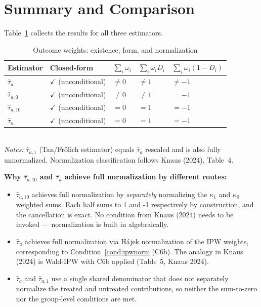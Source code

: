 \documentclass[12pt, a4paper]{article}
\theoremstyle{condstyle}
\theoremstyle{plain}
\newcommand{\that}[1]{\hat{\tau}_{#1}}
\begin{document}
\section{Summary and Comparison}
\label{sec:summary}

Table~\ref{tab:summary} collects the results for all three estimators.

\begin{table}[h!]
\centering
\caption{Outcome weights: existence, form, and normalization}
\label{tab:summary}
\renewcommand{\arraystretch}{1.4}
\begin{tabular}{@{}lllll@{}}
\toprule
Estimator & Closed-form & $\sum_i\omega_i$ & $\sum_i\omega_iD_i$ & $\sum_i\omega_i(1-D_i)$ \\
\midrule
$\that{a}$    & $\checkmark$ (unconditional) & $\neq 0$ & $\neq 1$ & $\neq -1$ \\
$\that{a,0}$  & $\checkmark$ (unconditional) & $\neq 0$ & $\neq 1$ & $= -1$    \\
$\that{a,10}$ & $\checkmark$ (unconditional) & $= 0$    & $= 1$    & $= -1$    \\
$\that{u}$    & $\checkmark$ (unconditional) & $= 0$    & $= 1$    & $= -1$    \\
\bottomrule
\end{tabular}\\[4pt]
\small\textit{Notes:} $\that{a,1}$ (Tan/Frölich estimator) equals $\that{a}$ rescaled and is also fully unnormalized.
Normalization classification follows Knaus (2024), Table~4.
\end{table}

\medskip
\noindent\textbf{Why $\that{a,10}$ and $\that{u}$ achieve full normalization by different routes:}
\begin{itemize}
  \item $\that{a,10}$ achieves full normalization by \emph{separately} normalizing the $\kappa_1$
        and $\kappa_0$ weighted sums.
        Each half sums to 1 and -1 respectively by construction, and the cancellation is exact.
        No condition from Knaus (2024) needs to be invoked --- normalization is built in algebraically.
  \item $\that{u}$ achieves full normalization via Hájek normalization of the IPW weights,
        corresponding to Condition~\ref{cond:ipwnorm}(C6b).
        The analogy in Knaus (2024) is Wald-IPW with C6b applied (Table~5, Knaus 2024).
  \item $\that{a}$ and $\that{a,1}$ use a single shared denominator that does not separately
        normalize the treated and untreated contributions, so neither the sum-to-zero
        nor the group-level conditions are met.
\end{itemize}
\end{document}
